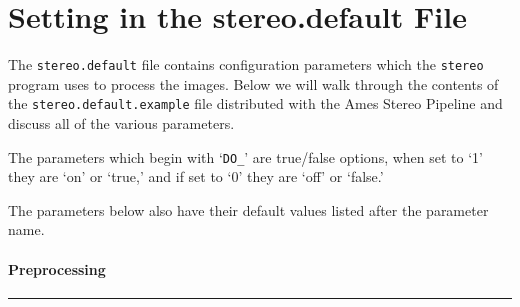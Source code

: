 \chapter{Setting in the stereo.default File}
\label{chapter:stereodefault}

The \texttt{stereo.default} file contains configuration parameters
which the \texttt{stereo} program uses to process the images.  Below
we will walk through the contents of the \texttt{stereo.default.example}
file distributed with the Ames Stereo Pipeline and discuss all of
the various parameters.

The parameters which begin with `\texttt{DO\_}' are true/false options,
when set to `1' they are `on' or `true,' and if set to `0' they are
`off' or `false.'

The parameters below also have their default values listed after
the parameter name.

\subsubsection*{Preprocessing}
\hrule
\bigskip

